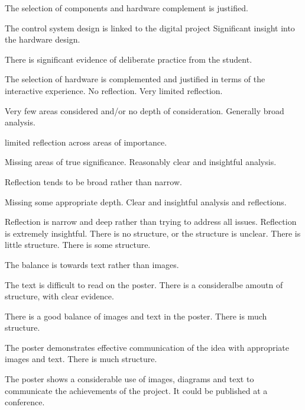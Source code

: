 \documentclass{../../fal_assignment}
\begin{document}
\begin{markingrubric}
	\par The selection of components and hardware complement is justified.
	\par The control system design is linked to the digital project
	\grade Significant insight into the hardware design.
	\par There is significant evidence of deliberate practice from the student.
	\par The selection of hardware is complemented and justified in terms of the interactive experience.
	\grade\fail 	No reflection.
	\grade 		Very limited reflection.
	\par Very few areas considered and/or no depth of consideration.
	\grade 		Generally broad analysis.  
	\par limited reflection across areas of importance.
	\par Missing areas of true significance. 
	\grade 		Reasonably clear and insightful analysis.
	\par Reflection tends to be broad rather than narrow.
	\par Missing some appropriate depth. 
	\grade 		Clear and insightful analysis and reflections.
	\par Reflection is narrow and deep rather than trying to address all issues.
	\grade 		Reflection is extremely insightful.
	\grade\fail 	There is no structure, or the structure is unclear.
	\grade 		There is little structure.
	\grade 		There is some structure.
	\par 		The balance is towards text rather than images.
	\par		The text is difficult to read on the poster.
	\grade 		There is a consideralbe amoutn of structure, with clear evidence.
	\par 		There is a good balance of images and text in the poster.
	\grade 		There is much structure.
	\par 		The poster demonstrates effective communication of the idea with appropriate images and text.
	\grade 		There is much structure.
	\par 		The poster shows a considerable use of images, diagrams and text to communicate the achievements of the project. It could be published at a conference.
\end{markingrubric}
\end{document}
